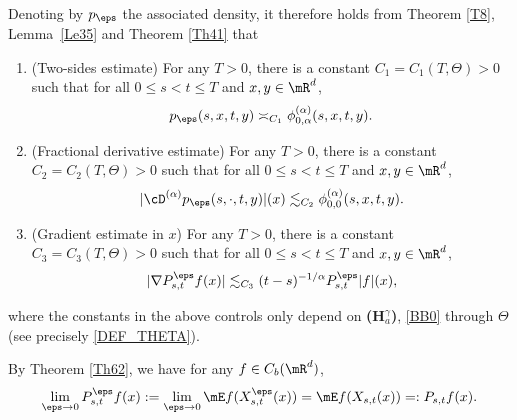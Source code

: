 Denoting by $p_\eps $ the associated density, it therefore holds from Theorem \ref{T8},
Lem\-ma~\ref{Le35} and Theorem \ref{Th41} that
\begin{enumerate}
\item (Two-sides estimate) For any $T>0$, there is a constant $C_1=C_1(T,\Theta)>0$ such that for all $0\leq s<t\leq T$ and $x,y\in\mR^d$,
\begin{equation}\label{TW_EPS}
p_\eps(s,x,t,y)\asymp_{C_1} \phi^{(\alpha)}_{0,\alpha}(s,x,t,y).
\end{equation}
\item (Fractional derivative estimate) For any $T>0$, there is a constant $C_2=C_2(T,\Theta)>0$ such that for all $0\leq s<t\leq T$ and $x,y\in\mR^d$,
\begin{equation}\label{FR_EPS}
|\cD^{(\alpha)}{p_\eps(s,\cdot,t,y)}|(x)\lesssim_{C_2}\phi^{(\alpha)}_{0,0}(s,x,t,y).
\end{equation}
\item (Gradient estimate in $x$) For any $T>0$, there is a constant $C_3=C_3(T,\Theta)>0$ such that for all $0\leq s<t\leq T$ and $x,y\in\mR^d$,
\begin{equation}\label{GR_EPS}
|\nabla P^\eps_{s,t}f(x)|\lesssim_{C_3} (t-s)^{-1/\alpha}P^\eps_{s,t}|f|(x),
\end{equation}
\end{enumerate}
where the constants in the above controls only depend on {\bf (H$^\gamma_a$)}, \eqref{BB0} through $\Theta $
(see precisely \eqref{DEF_THETA}).

By Theorem \ref{Th62}, we have for any $f\in C_b(\mR^d)$,
\begin{equation}\label{LL9}
\lim_{\eps\to 0}P^\eps_{s,t}f(x):=\lim_{\eps\to 0}\mE f(X^\eps_{s,t}(x))=\mE f(X_{s,t}(x))=:P_{s,t}f(x).
\end{equation}

